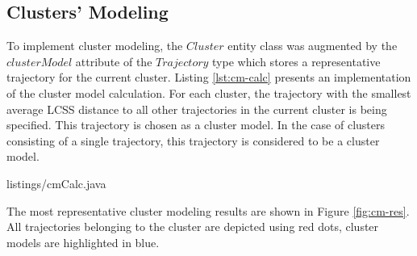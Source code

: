 \subsection{Clusters' Modeling}

To implement cluster modeling, the $Cluster$ entity class was augmented by the $clusterModel$ attribute of the $Trajectory$ type which stores a representative trajectory for the current cluster. Listing \ref{lst:cm-calc} presents an implementation of the cluster model calculation. For each cluster, the trajectory with the smallest average LCSS distance to all other trajectories in the current cluster is being specified. This trajectory is chosen as a cluster model. In the case of clusters consisting of a single trajectory, this trajectory is considered to be a cluster model.

 {listings/cmCalc.java}

The most representative cluster modeling results are shown in Figure \ref{fig:cm-res}. All trajectories belonging to the cluster are depicted using red dots, cluster models are highlighted in blue.

